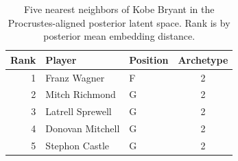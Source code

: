 \begin{table}[htbp]
  \centering\small
  \begin{tabular}{rllc}
    \toprule
    Rank & Player & Position & Archetype \\
    \midrule
    1 & Franz Wagner & F & 2 \\
    2 & Mitch Richmond & G & 2 \\
    3 & Latrell Sprewell & G & 2 \\
    4 & Donovan Mitchell & G & 2 \\
    5 & Stephon Castle & G & 2 \\
    \bottomrule
  \end{tabular}
  \caption{Five nearest neighbors of Kobe Bryant in the Procrustes-aligned posterior latent space. Rank is by posterior mean embedding distance.}
  \label{tab:Kobe_Bryant_neighbors}
\end{table}

